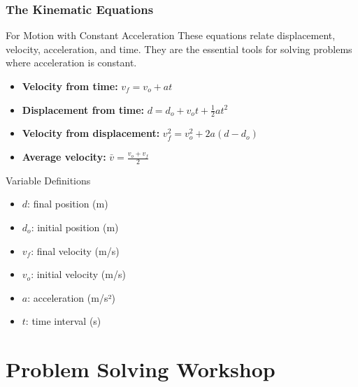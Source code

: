 \documentclass{beamer}
\begin{document}
\begin{frame}[allowframebreaks]
\frametitle{The Kinematic Equations}
\begin{block}{For Motion with Constant Acceleration}
These equations relate displacement, velocity, acceleration, and time. They are the essential tools for solving problems where acceleration is constant.

\begin{itemize}
    \item[] \textbf{Velocity from time:} \hspace{1.1cm} $ v_f = v_o + at $
    \item[] \textbf{Displacement from time:} \quad $ d = d_o + v_o t + \frac{1}{2}at^2 $
    \item[] \textbf{Velocity from displacement:} $ v_f^2 = v_o^2 + 2a(d - d_o) $
    \item[] \textbf{Average velocity:} \hspace{1.4cm} $ \bar{v} = \frac{v_o + v_f}{2} $
\end{itemize}
\end{block}

\begin{block}{Variable Definitions}
\begin{itemize}
    \item $d$: final position (m)
    \item $d_o$: initial position (m)
    \item $v_f$: final velocity (m/s)
    \item $v_o$: initial velocity (m/s)
    \item $a$: acceleration (m/s²)
    \item $t$: time interval (s)
\end{itemize}
\end{block}
\end{frame}

\section{Problem Solving Workshop}
\end{document}
